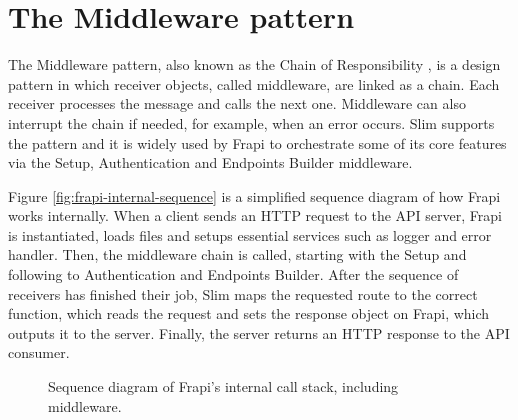 \section{The Middleware pattern}
\label{sec:middleware}

The Middleware pattern, also known as the Chain of Responsibility \cite{chain-of-responsibility}, is a design pattern in which receiver objects, called middleware, are linked as a chain. Each receiver processes the message and calls the next one. Middleware can also interrupt the chain if needed, for example, when an error occurs. Slim supports the pattern \cite{slim-middleware-doc} and it is widely used by Frapi to orchestrate some of its core features via the Setup, Authentication and Endpoints Builder middleware.

Figure \autoref{fig:frapi-internal-sequence} is a simplified sequence diagram of how Frapi works internally. When a client sends an HTTP request to the API server, Frapi is instantiated, loads files and setups essential services such as logger and error handler. Then, the middleware chain is called, starting with the Setup and following to Authentication and Endpoints Builder. After the sequence of receivers has finished their job, Slim maps the requested route to the correct function, which reads the request and sets the response object on Frapi, which outputs it to the server. Finally, the server returns an HTTP response to the API consumer.

\begin{figure}[htbp]
  \centering
  
  \caption{Sequence diagram of Frapi's internal call stack, including middleware.}
  \label{fig:frapi-internal-sequence}
\end{figure}